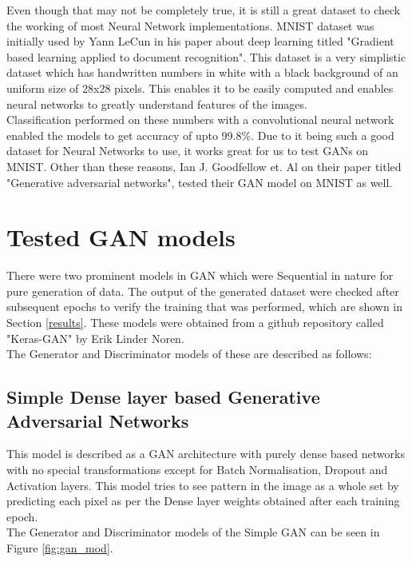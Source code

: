 \documentclass[conference]{IEEEtran}
\begin{document}
Even though that may not be completely true, it is still a great dataset to check the working of most Neural Network implementations. MNIST dataset was initially used by Yann LeCun in his paper about deep learning titled "Gradient based learning applied to document recognition"\cite{lecunmnist}. This dataset is a very simplistic dataset which has handwritten numbers in white with a black background of an uniform size of 28x28 pixels. This enables it to be easily computed and enables neural networks to greatly understand features of the images. 
\\
Classification performed on these numbers with a convolutional neural network enabled the models to get accuracy of upto 99.8\%\cite{mnistdetect}. Due to it being such a good dataset for Neural Networks to use, it works great for us to test GANs on MNIST. Other than these reasons, Ian J. Goodfellow et. Al on their paper titled "Generative adversarial networks", tested their GAN model on MNIST as well\cite{iangan}.

\section{Tested GAN models}\label{examples}

There were two prominent models in GAN which were Sequential in nature for pure generation of data. The output of the generated dataset were checked after subsequent epochs to verify the training that was performed, which are shown in Section \ref{results}. These models were obtained from a github repository called "Keras-GAN" by Erik Linder Noren\cite{kerasgan}.
\\
The Generator and Discriminator models of these are described as follows:

\subsection{Simple Dense layer based Generative Adversarial Networks}

This model is described as a GAN architecture with purely dense based networks with no special transformations except for Batch Normalisation, Dropout and Activation layers. This model tries to see pattern in the image as a whole set by predicting each pixel as per the Dense layer weights obtained after each training epoch. 
\\
The Generator and Discriminator models of the Simple GAN can be seen in Figure \ref{fig:gan_mod}.
\end{document}
